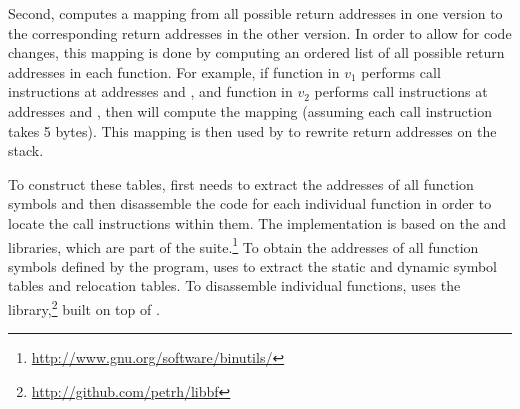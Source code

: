 Second, \sea computes a mapping from all possible return addresses in
one version to the corresponding return addresses in the other version.  In
order to allow for code changes, this mapping is done by computing an
ordered list of all possible return addresses in each function.  For
example, if function  in $v_1$ performs call instructions
at addresses  and , and
function  in $v_2$ performs call instructions at
addresses  and , then \sea
will compute the mapping  (assuming each call
instruction takes 5 bytes).  This mapping is then used by \rem to
rewrite return addresses on the stack.



To construct these tables, \sea first needs to extract the addresses
of all function symbols and then disassemble the code for each
individual function in order to locate the call instructions within
them.  The implementation is based on the 
and  libraries, which are 
part of the
\gnu \binutils suite.\footnote{\url{http://www.gnu.org/software/binutils/}}
To obtain the addresses of all function symbols defined by the
program, \sea uses  to extract the static and dynamic
symbol tables and relocation tables.  To disassemble individual
functions, \sea uses the 
library,\footnote{\url{http://github.com/petrh/libbf}} 
built on top of .



